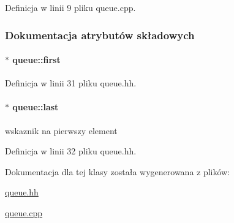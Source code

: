 Definicja w linii 9 pliku queue.\+cpp.



\subsubsection{Dokumentacja atrybutów składowych}
\hypertarget{classqueue_a8ee8b1ac8ce013be020685f8731e45c9}{}
\paragraph[{first}]{$\ast$ queue\+::first}\label{classqueue_a8ee8b1ac8ce013be020685f8731e45c9}


Definicja w linii 31 pliku queue.\+hh.

\hypertarget{classqueue_a6271d8d9ca79fbde8d114c0c155a6ffc}{}
\paragraph[{last}]{$\ast$ queue\+::last}\label{classqueue_a6271d8d9ca79fbde8d114c0c155a6ffc}
wskaznik na pierwszy element 

Definicja w linii 32 pliku queue.\+hh.



Dokumentacja dla tej klasy została wygenerowana z plików\+:\begin{DoxyCompactItemize}
\item 
\hyperlink{queue_8hh}{queue.\+hh}\item 
\hyperlink{queue_8cpp}{queue.\+cpp}\end{DoxyCompactItemize}

